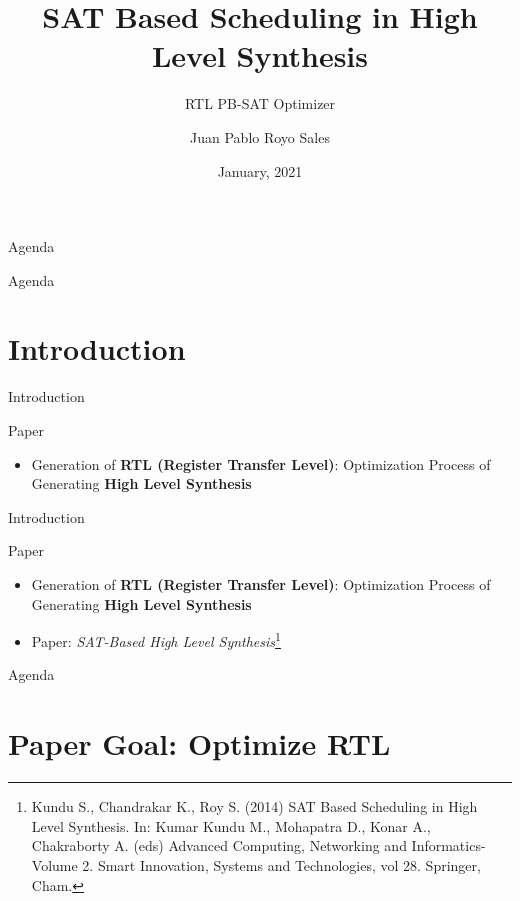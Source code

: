 \documentclass{beamer}
\title{SAT Based Scheduling in High Level Synthesis}
\subtitle{RTL PB-SAT Optimizer}
\author{Juan Pablo Royo Sales}
\institute{Universitat Politècnica de Catalunya}
\date{January, 2021}
\begin{document}
\begin{frame}
\titlepage
\end{frame}

\begin{frame}{Agenda}
  \tableofcontents
\end{frame}

\begin{frame}{Agenda}
  \section{Introduction}
  \tableofcontents[currentsection]
\end{frame}

\begin{frame}[fragile]{Introduction}
  \begin{block}{Paper}
      \begin{itemize}
        \item Generation of \textbf{RTL (Register Transfer Level)}: Optimization Process of Generating \textbf{High Level Synthesis} 
    \end{itemize}
  \end{block}
\end{frame}

\begin{frame}[fragile]{Introduction}
  \begin{block}{Paper}
      \begin{itemize}
        \item Generation of \textbf{RTL (Register Transfer Level)}: Optimization Process of Generating \textbf{High Level Synthesis} 
        \item Paper: \textit{SAT-Based High Level Synthesis}\footnote{Kundu S., Chandrakar K., Roy S. (2014) SAT Based Scheduling in High Level Synthesis. In: Kumar Kundu M., Mohapatra D., Konar A., Chakraborty A. (eds) Advanced Computing, Networking and Informatics- Volume 2. Smart Innovation, Systems and Technologies, vol 28. Springer, Cham.}
    \end{itemize}
  \end{block}
\end{frame}


\begin{frame}{Agenda}
  \section{Paper Goal: Optimize RTL}
  \tableofcontents[currentsection]
\end{frame}
\end{document}

